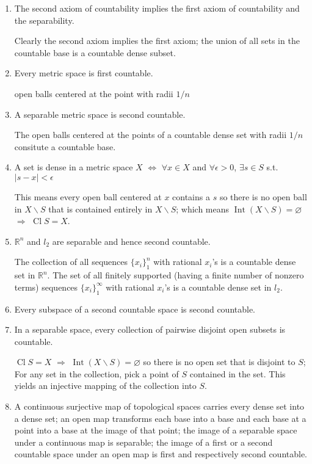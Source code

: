 \documentclass{article}
\DeclareMathOperator{\Int}{Int}
\DeclareMathOperator{\Cl}{Cl}
\begin{document}
\begin{enumerate}
\item The second axiom of countability implies the first axiom of countability and the separability.

Clearly the second axiom implies the first axiom; the union of all sets in the countable base is a countable dense subset.
\item Every metric space is first countable.

open balls centered at the point with radii \(1/n\)
\item A separable metric space is second countable.

The open balls centered at the points of a countable dense set with radii \(1/n\) consitute a countable base.
\item A set is dense in a metric space \(X\) \(\Longleftrightarrow\) \(\forall x\in X\) and \(\forall \epsilon>0\), \(\exists s\in S\) s.t. \(|s-x|<\epsilon\)

This means every open ball centered at \(x\) contains a \(s\) so there is no open ball in \(X\backslash S\) that is contained entirely in \(X\backslash S\); which means \(\Int(X\backslash S)=\varnothing\) \(\Longrightarrow\) \(\Cl S=X\).
\item \(\mathbb{R}^{n}\) and \(l_{2}\) are separable and hence second countable.

The collection of all sequences \(\{x_{i}\}_{1}^{n}\) with rational \(x_{i}\)'s is a countable dense set in \(\mathbb{R}^{n}\).
The set of all finitely supported (having a finite number of nonzero terms) sequences \(\{x_{i}\}_{1}^{\infty}\) with rational \(x_{i}\)'s is a countable dense set in \(l_{2}\).
\item Every subspace of a second countable space is second countable.
\item In a separable space, every collection of pairwise disjoint open subsets is countable.

\(\Cl S=X\) \(\Longrightarrow\) \(\Int(X\backslash S)=\varnothing\) so there is no open set that is disjoint to \(S\); For any set in the collection, pick a point of \(S\) contained in the set. This yields an injective mapping of the collection into \(S\).
\item A continuous surjective map of topological spaces carries every dense set into a dense set; an open map transforms each base into a base and each base at a point into a base at the image of that point; the image of a separable space under a continuous map is separable; the image of a first or a second countable space under an open map is first and respectively second countable.


\end{enumerate}
\end{document}
